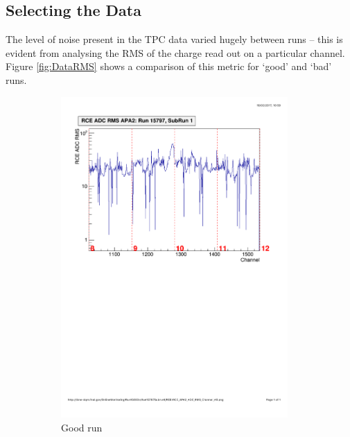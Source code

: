 \subsection{Selecting the Data}\label{sec:SelectingTheData}

The level of noise present in the TPC data varied hugely between runs -- this is evident from analysing the RMS of the charge read out on a particular channel.  Figure \ref{fig:DataRMS} shows a comparison of this metric for `good' and `bad' runs.

\begin{figure}[h]
  \centering
  \begin{subfigure}{0.45\linewidth}
    \centering
    \includegraphics[width=0.95\textwidth]{DataRMSGood.pdf}
    \caption{Good run}
    \label{fig:DataRMSGoodRun}
  \end{subfigure}
  \hfill
  \begin{subfigure}{0.45\linewidth}

\end{subfigure}
\end{figure}

